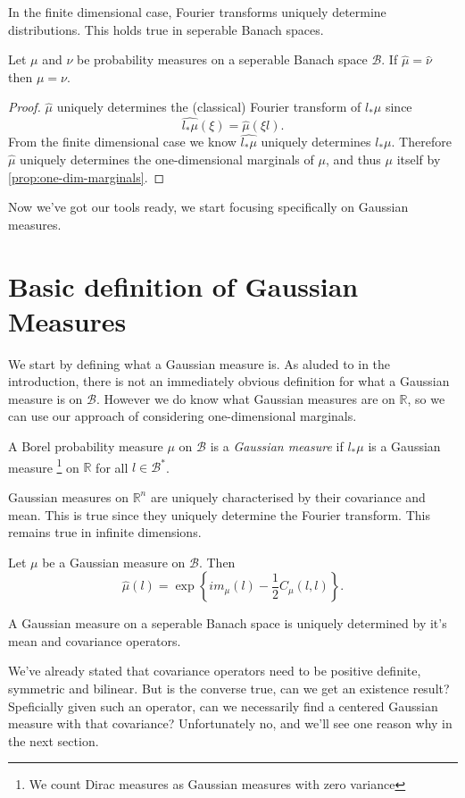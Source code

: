 \documentclass[fontsize=12pt, DIV=10]{scrreprt}
\theoremstyle{remark}
\newcommand{\R}{\mathbb R}
\newcommand{\calB}{\mathcal B}
\begin{document}
In the finite dimensional case, Fourier transforms uniquely determine distributions. This holds true in seperable Banach spaces.
\begin{prop}
	Let $\mu$ and $\nu$ be probability measures on a seperable Banach space $\calB$. If $\hat{\mu} = \hat{\nu}$ then $\mu = \nu$.
\end{prop}
\begin{proof}
	$\hat{\mu}$ uniquely determines the (classical) Fourier transform of $l_* \mu$ since
	\begin{equation}
		\widehat{l_* \mu}(\xi) = \hat{\mu}(\xi l).
	\end{equation}
	From the finite dimensional case we know $\widehat{l_* \mu}$ uniquely determines $l_* \mu$. Therefore $\hat{\mu}$ uniquely determines the one-dimensional marginals of $\mu$, and thus $\mu$ itself by \vref{prop:one-dim-marginals}.
\end{proof}

Now we've got our tools ready, we start focusing specifically on Gaussian measures.

\section{Basic definition of Gaussian Measures}

We start by defining what a Gaussian measure is. As aluded to in the introduction, there is not an immediately obvious definition for what a Gaussian measure is on $\calB$. However we do know what Gaussian measures are on $\R$, so we can use our approach of considering one-dimensional marginals.
\begin{defn}
	A Borel probability measure $\mu$ on $\calB$ is a \emph{Gaussian measure} if $l_* \mu$ is a Gaussian measure \footnote{We count Dirac measures as Gaussian measures with zero variance} on $\R$ for all $l \in \calB^*$.
\end{defn}

Gaussian measures on $\R^n$ are uniquely characterised by their covariance and mean. This is true since they uniquely determine the Fourier transform. This remains true in infinite dimensions.
\begin{prop}
	Let $\mu$ be a Gaussian measure on $\calB$. Then
	\begin{equation}
		\hat{\mu}(l) = \exp\left\{i m_{\mu}(l) - \frac{1}{2} C_{\mu}(l, l) \right\}.
	\end{equation}
\end{prop}
\begin{corollary}
	A Gaussian measure on a seperable Banach space is uniquely determined by it's mean and covariance operators.
\end{corollary}
We've already stated that covariance operators need to be positive definite, symmetric and bilinear. But is the converse true, can we get an existence result? Speficially given such an operator, can we necessarily find a centered Gaussian measure with that covariance? Unfortunately no, and we'll see one reason why in the next section.
\end{document}
